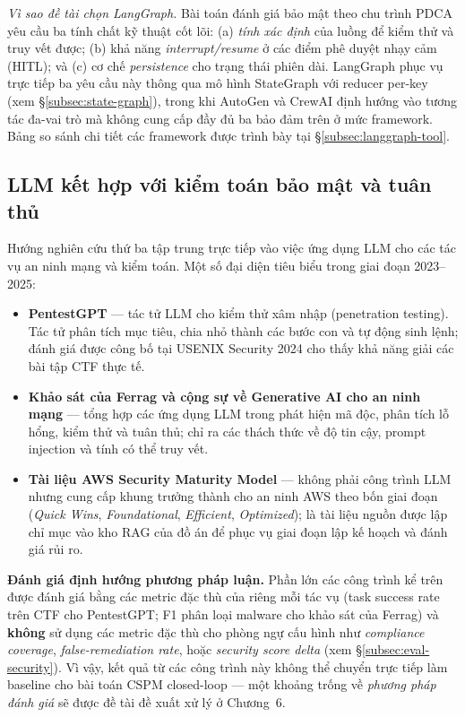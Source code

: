 \noindent\textit{Vì sao đề tài chọn LangGraph.} Bài toán đánh giá bảo mật theo chu trình PDCA yêu cầu ba tính chất kỹ thuật cốt lõi: (a) \textit{tính xác định} của luồng để kiểm thử và truy vết được; (b) khả năng \textit{interrupt/resume} ở các điểm phê duyệt nhạy cảm (HITL); và (c) cơ chế \textit{persistence} cho trạng thái phiên dài. LangGraph phục vụ trực tiếp ba yêu cầu này thông qua mô hình StateGraph với reducer per-key (xem §\ref{subsec:state-graph}), trong khi AutoGen và CrewAI định hướng vào tương tác đa-vai trò mà không cung cấp đầy đủ ba bảo đảm trên ở mức framework. Bảng so sánh chi tiết các framework được trình bày tại §\ref{subsec:langgraph-tool}.

\subsection{LLM kết hợp với kiểm toán bảo mật và tuân thủ}
\label{subsec:rw-llm-audit}

Hướng nghiên cứu thứ ba tập trung trực tiếp vào việc ứng dụng LLM cho các tác vụ an ninh mạng và kiểm toán. Một số đại diện tiêu biểu trong giai đoạn 2023--2025:
\begin{itemize}
    \item \textbf{PentestGPT} \cite{deng2024pentestgpt} — tác tử LLM cho kiểm thử xâm nhập (penetration testing). Tác tử phân tích mục tiêu, chia nhỏ thành các bước con và tự động sinh lệnh; đánh giá được công bố tại USENIX Security 2024 cho thấy khả năng giải các bài tập CTF thực tế.
    \item \textbf{Khảo sát của Ferrag và cộng sự về Generative AI cho an ninh mạng} \cite{ferrag2024genai_cybersec} — tổng hợp các ứng dụng LLM trong phát hiện mã độc, phân tích lỗ hổng, kiểm thử và tuân thủ; chỉ ra các thách thức về độ tin cậy, prompt injection và tính có thể truy vết.
    \item \textbf{Tài liệu AWS Security Maturity Model} \cite{aws_smm} — không phải công trình LLM nhưng cung cấp khung trưởng thành cho an ninh AWS theo bốn giai đoạn (\textit{Quick Wins}, \textit{Foundational}, \textit{Efficient}, \textit{Optimized}); là tài liệu nguồn được lập chỉ mục vào kho RAG của đồ án để phục vụ giai đoạn lập kế hoạch và đánh giá rủi ro.
\end{itemize}

\noindent\textbf{Đánh giá định hướng phương pháp luận.} Phần lớn các công trình kể trên được đánh giá bằng các metric đặc thù của riêng mỗi tác vụ (task success rate trên CTF cho PentestGPT; F1 phân loại malware cho khảo sát của Ferrag) và \textbf{không} sử dụng các metric đặc thù cho phòng ngự cấu hình như \textit{compliance coverage}, \textit{false-remediation rate}, hoặc \textit{security score delta} (xem §\ref{subsec:eval-security}). Vì vậy, kết quả từ các công trình này không thể chuyển trực tiếp làm baseline cho bài toán CSPM closed-loop --- một khoảng trống về \textit{phương pháp đánh giá} sẽ được đề tài đề xuất xử lý ở Chương~6.

